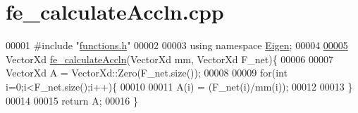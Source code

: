 \hypertarget{fe__calculate_accln_8cpp_source}{}\section{fe\+\_\+calculate\+Accln.\+cpp}
\label{fe__calculate_accln_8cpp_source}

\begin{DoxyCode}
00001 \textcolor{preprocessor}{#include "\hyperlink{functions_8h}{functions.h}"}
00002 
00003 \textcolor{keyword}{using namespace }\hyperlink{namespace_eigen}{Eigen};
00004 
\hyperlink{fe__calculate_accln_8cpp_a049ed85fefb5b5e80e42432fdcc640fa}{00005} VectorXd \hyperlink{fe__calculate_accln_8cpp_a049ed85fefb5b5e80e42432fdcc640fa}{fe\_calculateAccln}(VectorXd mm, VectorXd F\_net)\{
00006 
00007   VectorXd A = VectorXd::Zero(F\_net.size());
00008 
00009   \textcolor{keywordflow}{for}(\textcolor{keywordtype}{int} i=0;i<F\_net.size();i++)\{
00010 
00011     A(i) = (F\_net(i)/mm(i));
00012 
00013   \}
00014 
00015   \textcolor{keywordflow}{return} A;
00016 \}
\end{DoxyCode}
